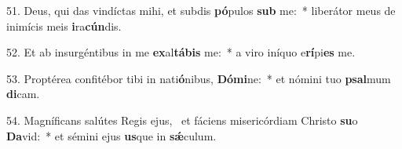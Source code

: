 51. Deus, qui das vindíctas mihi, et subdis \textbf{pó}pulos \textbf{sub} me:~*  liberátor meus de inimícis meis \textbf{i}ra\textbf{cún}dis.\

52. Et ab insurgéntibus in me \textbf{ex}al\textbf{tá}\textbf{bis} me:~*  a viro iníquo e\textbf{rí}pi\textbf{es} me.\

53. Proptérea confitébor tibi in nati\textbf{ó}nibus, \textbf{Dó}\textbf{mi}ne:~*  et nómini tuo \textbf{psal}mum \textbf{di}cam.\

54. Magníficans salútes Regis ejus, \dag\  et fáciens misericórdiam Christo \textbf{su}o \textbf{Da}vid:~*  et sémini ejus \textbf{us}que in \textbf{sǽ}culum.\

